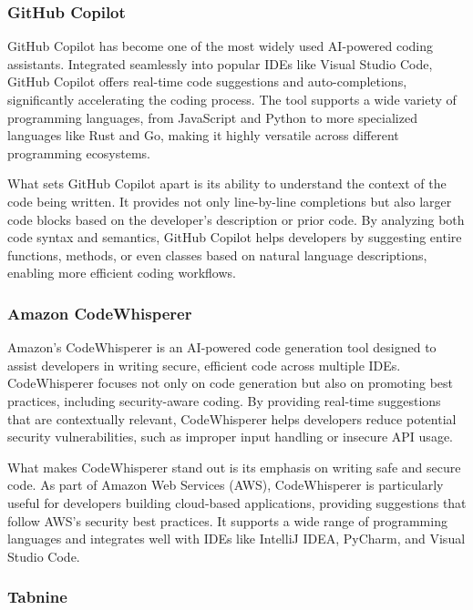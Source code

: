 \subsubsection{GitHub Copilot}

GitHub Copilot \cite{GitHubCopilot} has become one of the most widely used AI-powered coding assistants. Integrated seamlessly into popular IDEs like Visual Studio Code, GitHub Copilot offers real-time code suggestions and auto-completions, significantly accelerating the coding process. The tool supports a wide variety of programming languages, from JavaScript and Python to more specialized languages like Rust and Go, making it highly versatile across different programming ecosystems.

What sets GitHub Copilot apart is its ability to understand the context of the code being written. It provides not only line-by-line completions but also larger code blocks based on the developer's description or prior code. By analyzing both code syntax and semantics, GitHub Copilot helps developers by suggesting entire functions, methods, or even classes based on natural language descriptions, enabling more efficient coding workflows.

\subsubsection{Amazon CodeWhisperer}

Amazon's CodeWhisperer \cite{AmazonCodeWhisperer} is an AI-powered code generation tool designed to assist developers in writing secure, efficient code across multiple IDEs. CodeWhisperer focuses not only on code generation but also on promoting best practices, including security-aware coding. By providing real-time suggestions that are contextually relevant, CodeWhisperer helps developers reduce potential security vulnerabilities, such as improper input handling or insecure API usage.

What makes CodeWhisperer stand out is its emphasis on writing safe and secure code. As part of Amazon Web Services (AWS), CodeWhisperer is particularly useful for developers building cloud-based applications, providing suggestions that follow AWS's security best practices. It supports a wide range of programming languages and integrates well with IDEs like IntelliJ IDEA, PyCharm, and Visual Studio Code.

\subsubsection{Tabnine}

